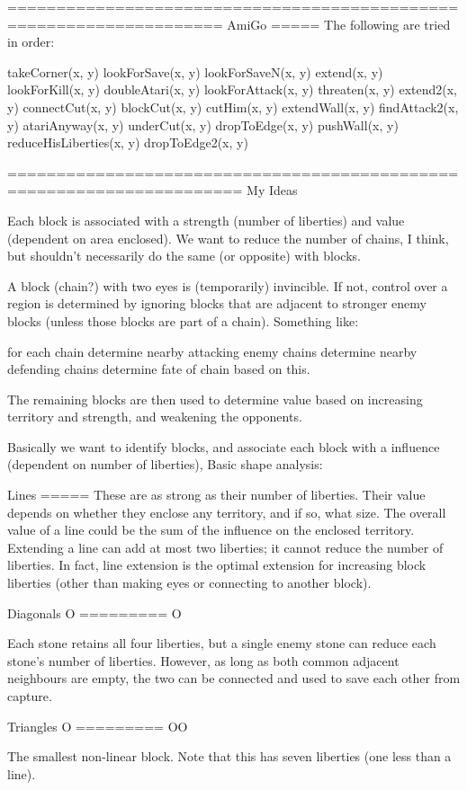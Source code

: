 ====================================================================
AmiGo
=====
The following are tried in order:

	takeCorner(x, y)
	lookForSave(x, y)
	lookForSaveN(x, y)
	extend(x, y)
	lookForKill(x, y)
	doubleAtari(x, y)
	lookForAttack(x, y)
	threaten(x, y)
	extend2(x, y)
	connectCut(x, y)
	blockCut(x, y)
	cutHim(x, y)
	extendWall(x, y)
	findAttack2(x, y)
	atariAnyway(x, y)
	underCut(x, y)
	dropToEdge(x, y)
	pushWall(x, y)
	reduceHisLiberties(x, y)
	dropToEdge2(x, y)
 
======================================================================
My Ideas

Each block is associated with a strength (number of liberties)
and value (dependent on area enclosed).
We want to reduce the number of chains, I think, but shouldn't
necessarily do the same (or opposite) with blocks.

A block (chain?) with two eyes is (temporarily) invincible. 
If not, control over a region is determined by ignoring blocks
that are adjacent to stronger enemy blocks (unless those blocks
are part of a chain). Something like:

	for each chain
		determine nearby attacking enemy chains
		determine nearby defending chains
		determine fate of chain based on this.

The remaining blocks are then used to determine value based on
increasing territory and strength, and weakening the opponents.


Basically we want to identify blocks, and associate each block
with a influence (dependent on number of liberties), 
Basic shape analysis:

Lines
=====
These are as strong as their number of liberties. Their
value depends on whether they enclose any territory,
and if so, what size. The overall value of a line
could be the sum of the influence on the enclosed
territory. Extending a line can add at most two
liberties; it cannot reduce the number of liberties.
In fact, line extension is the optimal extension for
increasing block liberties (other than making eyes or connecting
to another block).

Diagonals   O
=========  O

Each stone retains all four liberties, but a single enemy
stone can reduce each stone's number of liberties. However,
as long as both common adjacent neighbours are empty, the
two can be connected and used to save each other from capture.

Triangles   O
=========   OO

The smallest non-linear block.
Note that this has seven liberties (one less than a line).

	
